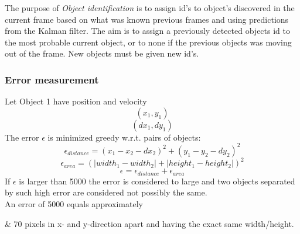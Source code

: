 The purpose of \emph{Object identification} is to assign id's to object's discovered in the current frame based on what was known previous frames and using predictions from the Kalman filter. The aim is to assign a previously detected objects id to the most probable current object, or to none if the previous objects was moving out of the frame. New objects must be given new id's. 

\subsubsection{Error measurement}
Let Object 1 have position and velocity
\begin{equation}
(x_1, y_1)
\end{equation}
\begin{equation}
(dx_1, dy_1)
\end{equation}
The error $\epsilon$ is minimized greedy w.r.t. pairs of objects:
\begin{equation}
  \epsilon_{distance} = (x_1 - x_2 - dx_2)^2 + (y_1 - y_2 - dy_2)^2
\end{equation}
\begin{equation}
  \epsilon_{area} = (|width_1 - width_2| + |height_1 - height_2|)^2
\end{equation}
\begin{equation}
  \epsilon = \epsilon_{distance} + \epsilon_{area}
\end{equation}
If $\epsilon$ is larger than 5000 the error is considered to large and two objects separated by such high error are considered not possibly the same.\\
\newline
An error of 5000 equals approximately
\begin{easylist}
& 70 pixels in x- and y-direction apart and having the exact same width/height.
\end{easylist}


